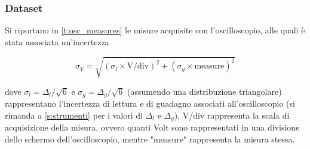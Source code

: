 \documentclass[a4paper,11pt]{article} %
\begin{document}

\subsubsection{Dataset}
Si riportano in  \autoref{t:osc_measures} le misure acquisite con l'oscilloscopio, alle quali è stata associata
un'incertezza

\begin{equation}\label{e:osc}
	\sigma_{V} = \sqrt{ (\sigma_{l}\times\text{V/div})^2 + (\sigma_{g}\times\text{measure})^2 }
\end{equation}

\noindent dove $\sigma_{l}=\Delta_{l}/\sqrt{6}$ e $\sigma_{g}=\Delta_{g}/\sqrt{6}$ (assumendo una distribuzione
triangolare) rappresentano l'incertezza di lettura e di guadagno associati all'oscilloscopio (si rimanda a
\autoref{s:strumenti} per i valori di $\Delta_{l}$ e $\Delta_{g}$), V/div rappresenta la scala di acquisizione della
misura, ovvero quanti Volt sono rappresentati in una divisione dello schermo dell'oscilloscopio, mentre "measure"
rappresenta la misura stessa.
\end{document}
